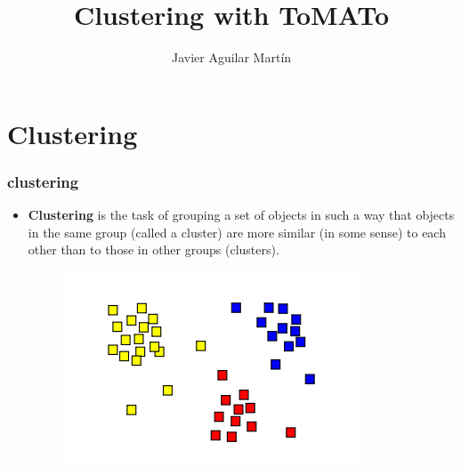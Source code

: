 \documentclass{beamer}
\title{Clustering with ToMATo}
\author{Javier Aguilar Mart\'in}
\institute{University of Kent}
\date{}
\theoremstyle{definition}
\begin{document}
\frame{\titlepage}





\newcommand{\seti}{\setcounter{saveenumi}{\value{enumi}}}
\newcommand{\conti}{\setcounter{enumi}{\value{saveenumi}}}

\makeatletter
\newcommand{\xRightarrow}[2][]{\ext@arrow 0359\Rightarrowfill@{#1}{#2}}
\makeatother




\section{Clustering}



\begin{frame}
\frametitle{clustering}
\begin{itemize}
\item \textbf{Clustering} is the task of grouping a set of objects in such a way that objects in the same group (called a cluster) are more similar (in some sense) to each other than to those in other groups (clusters). %

\begin{figure}
\includegraphics[scale=0.5]{cluster}
\end{figure}
\end{itemize}
\end{frame}
\end{document}

